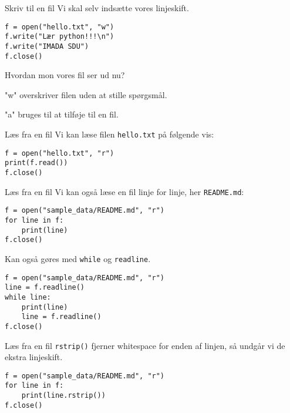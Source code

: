 \begin{frame}[fragile]{Skriv til en fil}
Vi skal selv indsætte vores linjeskift.

\begin{lstlisting}[style=python]
f = open("hello.txt", "w")
f.write("Lær python!!!\n")
f.write("IMADA SDU")
f.close()
\end{lstlisting}

Hvordan mon vores fil ser ud nu?

\pause

"w" overskriver filen uden at stille spørgsmål.

"a" bruges til at tilføje til en fil.

\end{frame}


\begin{frame}[fragile]{Læs fra en fil}
	Vi kan læse filen \texttt{hello.txt} på følgende vis:
	\begin{lstlisting}[style=python]
f = open("hello.txt", "r")
print(f.read())
f.close()
	\end{lstlisting}
	
\end{frame}

\begin{frame}[fragile]{Læs fra en fil}
	Vi kan også læse en fil linje for linje, her \texttt{README.md}:
	
	\begin{lstlisting}[style=python]
f = open("sample_data/README.md", "r")
for line in f:
	print(line)
f.close()
	\end{lstlisting}
	
	Kan også gøres med \texttt{while} og \texttt{readline}.
	\begin{lstlisting}[style=python]
f = open("sample_data/README.md", "r")
line = f.readline()
while line:
	print(line)
	line = f.readline()
f.close()
	\end{lstlisting}
\end{frame}


\begin{frame}[fragile]{Læs fra en fil}
	\texttt{rstrip()} fjerner whitespace for enden af linjen, så undgår vi de ekstra linjeskift.

\begin{lstlisting}[style=python]
f = open("sample_data/README.md", "r")
for line in f:
	print(line.rstrip())
f.close()
\end{lstlisting}

\end{frame}

